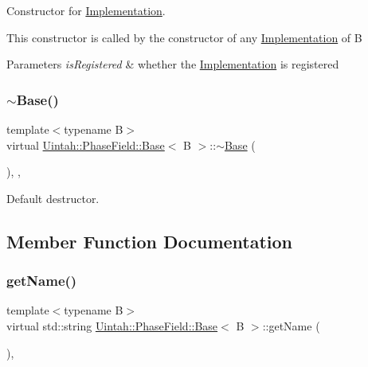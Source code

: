 Constructor for \hyperlink{classUintah_1_1PhaseField_1_1Implementation}{Implementation}. 

This constructor is called by the constructor of any \hyperlink{classUintah_1_1PhaseField_1_1Implementation}{Implementation} of B


\begin{DoxyParams}{Parameters}
{\em is\+Registered} & whether the \hyperlink{classUintah_1_1PhaseField_1_1Implementation}{Implementation} is registered \\
\hline
\end{DoxyParams}
\mbox{\label{classUintah_1_1PhaseField_1_1Base_a6c584b6c9a0a40c98870e6a25311fbff}} 
\subsubsection{\texorpdfstring{$\sim$\+Base()}{~Base()}}
{\footnotesize\ttfamily template$<$typename B$>$ \\
virtual \hyperlink{classUintah_1_1PhaseField_1_1Base}{Uintah\+::\+Phase\+Field\+::\+Base}$<$ B $>$\+::$\sim$\hyperlink{classUintah_1_1PhaseField_1_1Base}{Base} (\begin{DoxyParamCaption}{ }\end{DoxyParamCaption})\hspace{0.3cm}{\ttfamily [protected]}, {\ttfamily [virtual]}, {\ttfamily [default]}}



Default destructor. 



\subsection{Member Function Documentation}
\mbox{\label{classUintah_1_1PhaseField_1_1Base_acd19fa2507f239588926b04069ad1b73}} 
\subsubsection{\texorpdfstring{get\+Name()}{getName()}}
{\footnotesize\ttfamily template$<$typename B$>$ \\
virtual std\+::string \hyperlink{classUintah_1_1PhaseField_1_1Base}{Uintah\+::\+Phase\+Field\+::\+Base}$<$ B $>$\+::get\+Name (\begin{DoxyParamCaption}{ }\end{DoxyParamCaption})\hspace{0.3cm}{\ttfamily [protected]}, {}}



